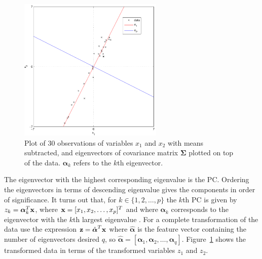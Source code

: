 \begin{figure}[!]
  \begin{center}
    \includegraphics[width=260px]{30observationsBarEig.pdf}
    \caption{Plot of 30 observations of variables $x_1$ and $x_2$ with means subtracted, and eigenvectors of covariance matrix $\boldsymbol\Sigma$ plotted on top of the data. $\boldsymbol\alpha_k$ refers to the $k$th eigenvector.}\label{fig:30observationsBarEig}
  \end{center}
\end{figure}

The eigenvector with the highest corresponding eigenvalue is the PC. Ordering the eigenvectors in terms of descending eigenvalue gives the components in order of significance. It turns out that, for $k \in \{1, 2, \ldots, p\}$ the $k$th PC is given by $z_k = \boldsymbol\alpha_k^T\textrm{\textbf{x}}$, where $\textrm{\textbf{x}} = [x_1,x_2,\ldots, x_p]^T$ and where $\boldsymbol\alpha_k$ corresponds to the eigenvector with the $k$th largest eigenvalue \citep[p. 2-3]{Jolliffe1986}. For a complete transformation of the data use the expression $\textrm{\textbf{z}} = \hat{\boldsymbol\alpha}^T\textrm{\textbf{x}}$ where $\hat{\boldsymbol\alpha}$ is the feature vector containing the number of eigenvectors desired $q$, so $\hat{\boldsymbol\alpha} = [\boldsymbol\alpha_1,\boldsymbol\alpha_2,\ldots,\boldsymbol\alpha_q]$. Figure~\ref{fig:30observationsBarEig} shows the transformed data in terms of the transformed variables $z_1$ and $z_2$.

